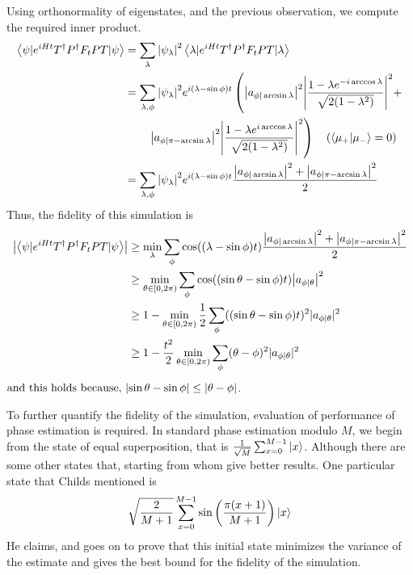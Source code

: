 \documentclass[
10pt, %
a4paper, %
oneside, %
headinclude,footinclude, %
BCOR5mm, %
]{scrartcl}
\begin{document}
Using orthonormality of eigenstates, and the previous observation, we compute the required inner product.
\begin{align*}
\left<\psi|e^{iHt}T^{\dagger}P^{\dagger}F_tPT|\psi\right>&=\sum_\lambda\abs{\psi_\lambda}^2\left<\lambda|e^{iHt}T^{\dagger}P^{\dagger}F_tPT|\lambda\right>\\
&=\sum_{\lambda,\phi}\abs{\psi_\lambda}^2e^{i(\lambda-\sin\phi)t}\left(\abs{a_{\phi|\arcsin\lambda}}^2\abs{\frac{1-\lambda e^{-i\arccos\lambda}}{\sqrt{2(1-\lambda^2)}}}^2+\right.\\
&\qquad\left.\abs{a_{\phi|\pi-\arcsin\lambda}}^2\abs{\frac{1-\lambda e^{i\arccos\lambda}}{\sqrt{2(1-\lambda^2)}}}^2\right)\ \ \ (\braket{\mu_+}{\mu_-}=0)\\
&=\sum_{\lambda,\phi}\abs{\psi_\lambda}^2e^{i(\lambda-\sin\phi)t}\frac{\abs{a_{\phi|\arcsin\lambda}}^2+\abs{a_{\phi|\pi-\arcsin\lambda}}^2}{2}
\end{align*}
Thus, the fidelity of this simulation is
\begin{align*}
\abs{\left<\psi|e^{iHt}T^{\dagger}P^{\dagger}F_tPT|\psi\right>}&\geq\min_\lambda\sum_\phi\cos((\lambda-\sin\phi)t)\frac{\abs{a_{\phi|\arcsin\lambda}}^2+\abs{a_{\phi|\pi-\arcsin\lambda}}^2}{2}\\
&\geq\min_{\theta\in[0,2\pi)}\sum_\phi\cos((\sin\theta-\sin\phi)t)\abs{a_{\phi|\theta}}^2\\
&\geq 1 - \min_{\theta \in [0,2\pi)} \frac{1}{2} \sum_{\phi} ((\sin \theta - \sin\phi)t)^2 |a_{\phi|\theta}|^2\\
&\geq 1 - \frac{t^2}{2}\min_{\theta \in [0, 2\pi)} \sum_\phi (\theta - \phi)^2 |a_{\phi|\theta}|^2
\end{align*}
$\text{and this holds because, } \abs{\sin\theta-\sin\phi}\leq\abs{\theta-\phi}$.\newline

To further quantify the fidelity of the simulation, evaluation of performance of phase estimation is required. In standard phase
estimation modulo $M$, we begin from the state of equal superposition, that is $\frac{1}{\sqrt M}\sum_{x=0}^{M-1}\ket x$. Although there are some other states that, starting from whom give better results. One particular state that Childs mentioned is
$$\sqrt{\frac{2}{M+1}}\sum_{x=0}^{M-1}\sin\left(\frac{\pi(x+1)}{M+1}\right)\ket x$$
He claims, and goes on to prove that this initial state minimizes the variance of the estimate and gives the best bound for the fidelity of the simulation.\newline
\end{document}
